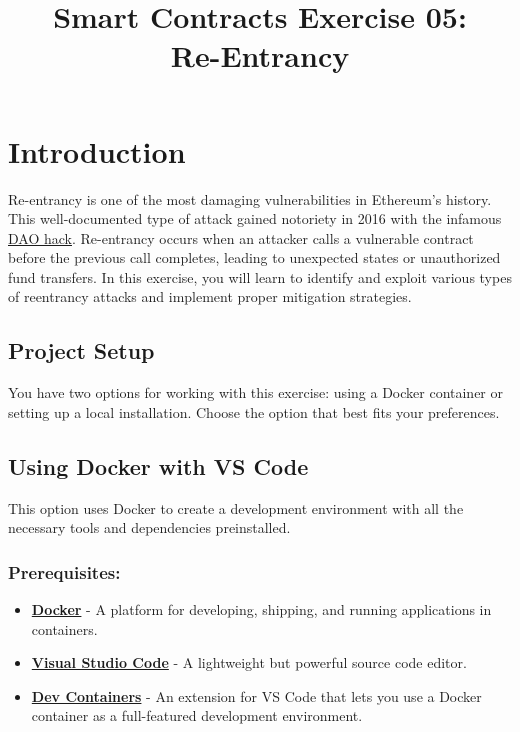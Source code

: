\documentclass[12pt]{article}
\title{Smart Contracts Exercise 05: \\ Re-Entrancy}
\author{}
\date{}
\begin{document}
\maketitle
\section{Introduction}

Re-entrancy is one of the most damaging vulnerabilities in Ethereum's history.
This well-documented type of attack gained notoriety in 2016 with the infamous
\href{https://en.wikipedia.org/wiki/The_DAO}{DAO hack}. Re-entrancy occurs when
an attacker calls a vulnerable contract before the previous call completes,
leading to unexpected states or unauthorized fund transfers. In this exercise,
you will learn to identify and exploit various types of reentrancy attacks and
implement proper mitigation strategies.

\subsection*{Project Setup}

You have two options for working with this exercise: using a Docker container
or setting up a local installation. Choose the option that best fits your
preferences.

\subsection{Using Docker with VS Code}

This option uses Docker to create a development environment with all the
necessary tools and dependencies preinstalled.

\subsubsection*{Prerequisites:}

\begin{itemize}
    \item \textbf{\href{https://www.docker.com/products/docker-desktop}{Docker}} - A platform for developing, shipping, and running applications in containers.
    \item \textbf{\href{https://code.visualstudio.com/}{Visual Studio Code}} - A lightweight but powerful source code editor.
    \item \textbf{\href{https://marketplace.visualstudio.com/items?itemName=ms-vscode-remote.remote-containers}{Dev Containers}} - An extension for VS Code that lets you use a Docker container as a full-featured development environment.
\end{itemize}
\end{document}
